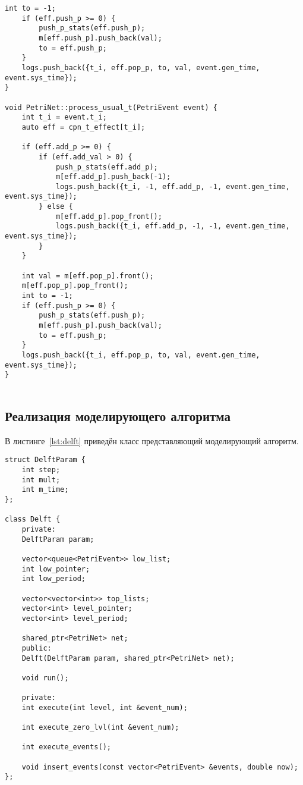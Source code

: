 \begin{center}
	\captionsetup{justification=raggedright,singlelinecheck=off}
	\begin{lstlisting}[label=lst:fire2,title=Ф,title=Продолжение листинга \ref{lst:fire} ,showstringspaces=false,firstnumber=38]		
	int to = -1;
	if (eff.push_p >= 0) {
		push_p_stats(eff.push_p);
		m[eff.push_p].push_back(val);
		to = eff.push_p;
	}
	logs.push_back({t_i, eff.pop_p, to, val, event.gen_time, event.sys_time});
}

void PetriNet::process_usual_t(PetriEvent event) {
	int t_i = event.t_i;
	auto eff = cpn_t_effect[t_i];
	
	if (eff.add_p >= 0) {
		if (eff.add_val > 0) {
			push_p_stats(eff.add_p);
			m[eff.add_p].push_back(-1);
			logs.push_back({t_i, -1, eff.add_p, -1, event.gen_time, event.sys_time});
		} else {
			m[eff.add_p].pop_front();
			logs.push_back({t_i, eff.add_p, -1, -1, event.gen_time, event.sys_time});
		}
	}
	
	int val = m[eff.pop_p].front();
	m[eff.pop_p].pop_front();
	int to = -1;
	if (eff.push_p >= 0) {
		push_p_stats(eff.push_p);
		m[eff.push_p].push_back(val);
		to = eff.push_p;
	}
	logs.push_back({t_i, eff.pop_p, to, val, event.gen_time, event.sys_time});
}
		
	\end{lstlisting}
\end{center}
\FloatBarrier

\subsection{Реализация моделирующего алгоритма}

В листинге~\ref{lst:delft} приведён класс представляющий моделирующий алгоритм.

\begin{center}
	\captionsetup{justification=raggedright,singlelinecheck=off}
	\begin{lstlisting}[label=lst:delft,caption=Класс моделирующего алгоритма ,showstringspaces=false]
struct DelftParam {
	int step;
	int mult;
	int m_time;
};

class Delft {
	private:
	DelftParam param;
	
	vector<queue<PetriEvent>> low_list;
	int low_pointer;
	int low_period;
	
	vector<vector<int>> top_lists;
	vector<int> level_pointer;
	vector<int> level_period;
	
	shared_ptr<PetriNet> net;
	public:
	Delft(DelftParam param, shared_ptr<PetriNet> net);
	
	void run();
	
	private:
	int execute(int level, int &event_num);
	
	int execute_zero_lvl(int &event_num);
	
	int execute_events();
	
	void insert_events(const vector<PetriEvent> &events, double now);
};		
	\end{lstlisting}
\end{center}
\FloatBarrier

